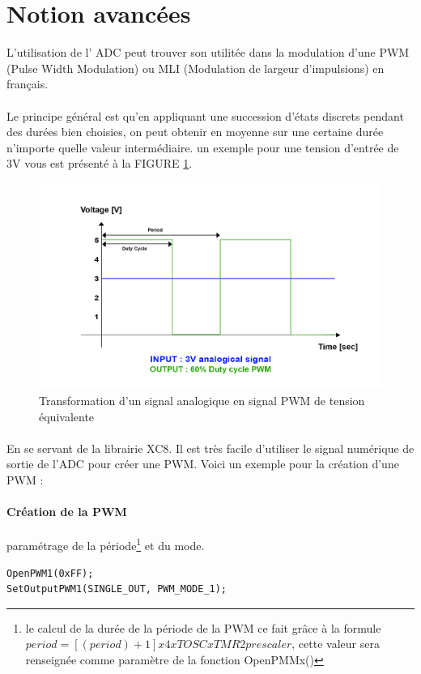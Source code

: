 \section{Notion avancées}
\label{notion}
L'utilisation de l' ADC peut trouver son utilitée dans la modulation d'une PWM (Pulse Width Modulation) ou  MLI (Modulation de largeur d'impulsions) en français. 
\paragraph{}
Le principe général est qu'en appliquant une succession d'états discrets pendant des durées bien choisies, on peut obtenir en moyenne sur une certaine durée n'importe quelle valeur intermédiaire. un exemple pour une tension d'entrée de 3V vous est présenté à la FIGURE \ref{pwm}.

\begin{figure}[h]
\begin{center}
\begin{framed}
\includegraphics[scale=0.8]{images/pwm.png}
\caption{Transformation d'un signal analogique en signal PWM de tension équivalente}
\label{pwm}
\end{framed}
\end{center}
\end{figure}

\paragraph{}
En se servant de la librairie XC8. Il est très facile d'utiliser le signal numérique de sortie de l'ADC pour créer une PWM. Voici un exemple pour la création d'une PWM :

\paragraph{Création de la PWM} paramétrage de la période\footnote{
le calcul de la durée de la période de la PWM ce fait grâce à la formule $period =[(period ) + 1] x 4 x TOSC x TMR2 prescaler$, cette valeur sera renseignée comme paramètre de la fonction OpenPMMx()} et du mode.
\begin{lstlisting}
OpenPWM1(0xFF);
SetOutputPWM1(SINGLE_OUT, PWM_MODE_1);
\end{lstlisting}

